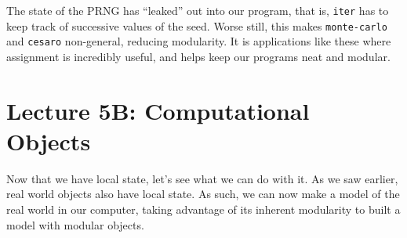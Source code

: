 \documentclass[9pt]{report}
\begin{document}
The state of the PRNG has ``leaked'' out into our program, that is,
\texttt{iter} has to keep track of successive values of the seed. Worse
still, this makes \texttt{monte-carlo} and \texttt{cesaro} non-general, reducing
modularity. It is applications like these where assignment is
incredibly useful, and helps keep our programs neat and modular.


























































































\chapter{Lecture 5B: Computational Objects}
\label{sec:org1bf0f62}

Now that we have local state, let's see what we can do with it. As
we saw earlier, real world objects also have local state. As such,
we can now make a model of the real world in our computer, taking
advantage of its inherent modularity to built a model with modular
objects.
\end{document}
